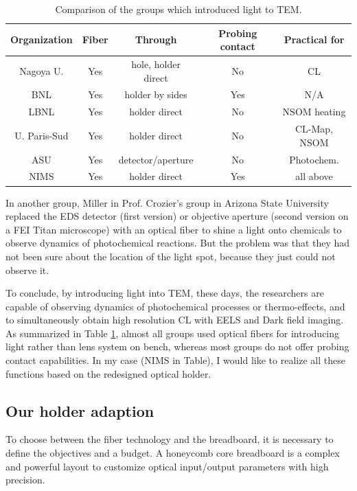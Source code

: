 \begin{table}[ht]
\centering 
\begin{tabular}{|c|c|c|c|c|} 
\hline 
Organization & Fiber & Through & Probing contact & Practical for\\ [0.5ex] 
\hline 
Nagoya U. & Yes & hole, holder direct & No & CL\\[1.5ex] 
BNL & Yes & holder by sides & Yes & N/A\\[1.5ex]
LBNL & Yes& holder direct & No & NSOM heating\\[1.5ex]
U. Paris-Sud & Yes & holder direct & No & CL-Map, NSOM\\[1.5ex]
ASU & Yes & detector/aperture & No & Photochem.\\[1.5ex]
NIMS & Yes & holder direct & Yes & all above\\
\hline
\end{tabular}
\caption{Comparison of the groups which introduced light to TEM.} 
\label{table2.2} 
\end{table}

In another group, Miller in Prof. Crozier's group in Arizona State University replaced the EDS detector (first version) or objective aperture (second version on a FEI Titan microscope) with an optical fiber to shine a light onto chemicals to observe dynamics of photochemical reactions.\cite{Miller2012} 
But the problem was that they had not been sure about the location of the light spot, because they just could not observe it.

To conclude, by introducing light into TEM, these days, the researchers are capable of observing dynamics of photochemical processes or thermo-effects, and to simultaneously obtain high resolution CL with EELS and Dark field imaging. As summarized in Table \ref{table2.2}, almost all groups used optical fibers for introducing light rather than lens system on bench, whereas most groups do not offer probing contact capabilities. In my case (NIMS in Table), I would like to realize all these functions based on the redesigned optical holder. 

\subsection{Our holder adaption}
To choose between the fiber technology and the breadboard, it is necessary to define the objectives and a budget. 
A honeycomb core breadboard is a complex and powerful layout to customize optical input/output parameters with high precision. 

